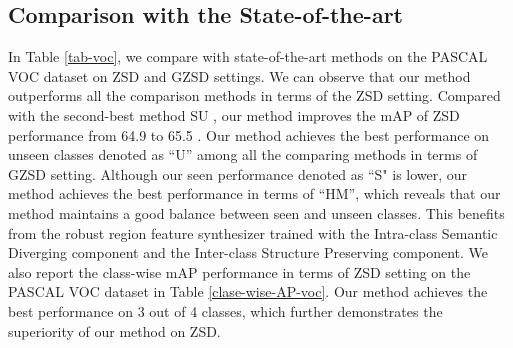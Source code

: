 \documentclass[10pt,twocolumn,letterpaper]{article}
\begin{document}
\subsection{Comparison with the State-of-the-art}
In Table \ref{tab-voc}, we compare with state-of-the-art methods on the PASCAL VOC dataset on ZSD and GZSD settings. We can observe that our method outperforms all the comparison methods in terms of the ZSD setting. Compared with the second-best method SU \cite{hayat2020synthesizing}, our method improves the mAP of ZSD performance from 64.9  to 65.5 . Our method achieves the best performance on unseen classes denoted as ``U'' among all the comparing methods in terms of GZSD setting.
Although our seen performance denoted as ``S" is lower, our method achieves the best performance in terms of ``HM'', which reveals that our method maintains a good balance between seen and unseen classes. This benefits from the robust region feature synthesizer trained with the Intra-class Semantic Diverging component and the Inter-class Structure Preserving component.
We also report the class-wise mAP performance in terms of ZSD setting on the PASCAL VOC dataset in Table \ref{clase-wise-AP-voc}. Our method
achieves the best performance on 3 out of 4 classes, which further demonstrates the superiority of our method on ZSD.
\end{document}
